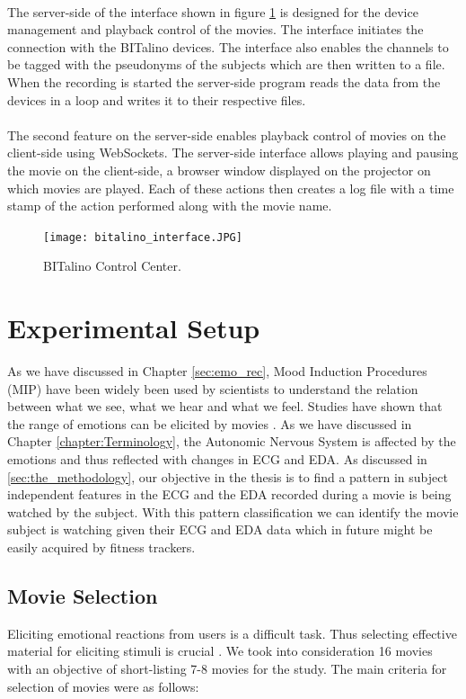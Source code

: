 \paragraph{}
The server-side of the interface shown in figure \ref{fig:bitalino_cc} is designed for the device management and playback control of the movies. The interface initiates the connection with the BITalino devices. The interface also enables the channels to be tagged with the pseudonyms of the subjects which are then written to a file. When the recording is started the server-side program reads the data from the devices in a loop and writes it to their respective files.
\paragraph{}
The second feature on the server-side enables playback control of movies on the client-side using WebSockets. The server-side interface allows playing and pausing the movie on the client-side, a browser window displayed on the projector on which movies are played. Each of these actions then creates a log file with a time stamp of the action performed along with the movie name.
\begin{figure}
\centering
\texttt{[image: bitalino\_interface.JPG]}
\caption{BITalino Control Center.}
\label{fig:bitalino_cc}
\end{figure}

\section{Experimental Setup}
As we have discussed in Chapter \ref{sec:emo_rec}, Mood Induction Procedures (MIP) have been widely been used by scientists to understand the relation between what we see, what we hear and what we feel. Studies have shown that the range of emotions can be elicited by movies \cite{gross_emotion_1995}. As we have discussed in Chapter \ref{chapter:Terminology}, the Autonomic Nervous System is affected by the emotions and thus reflected with changes in ECG and EDA. As discussed in \ref{sec:the_methodology}, our objective in the thesis is to find a pattern in subject independent features in the ECG and the EDA recorded during a movie is being watched by the subject. With this pattern classification we can identify the movie subject is watching given their ECG and EDA data which in future might be easily acquired by fitness trackers. 

\subsection{Movie Selection} Eliciting emotional reactions from users is a difficult task. Thus selecting effective material for eliciting stimuli is crucial \cite{koelstra_deap:_2012}. We took into consideration 16 movies with an objective of short-listing 7-8 movies for the study. The main criteria for selection of movies were as follows:

